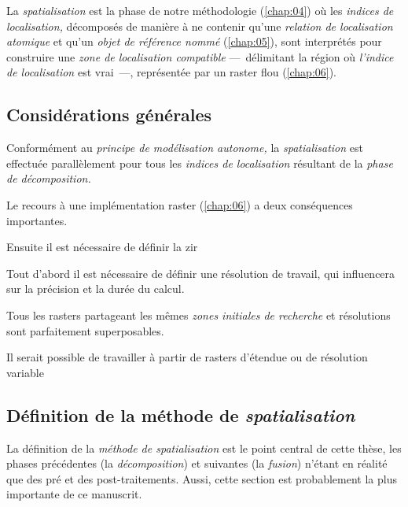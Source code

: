 La \emph{spatialisation} est la phase de notre méthodologie (\autoref{chap:04}) où les \emph{indices de localisation,} décomposés de manière à ne contenir qu'une \emph{relation de localisation atomique} et qu'un \emph{objet de référence nommé} (\autoref{chap:05}), sont interprétés pour construire une \emph{zone de localisation compatible} ---~délimitant la région où \emph{l'indice de localisation} est vrai~---, représentée par un raster flou (\autoref{chap:06}).

\subsection{Considérations générales}


Conformément au \emph{principe de modélisation autonome,} la \emph{spatialisation} est effectuée parallèlement pour tous les \emph{indices de localisation} résultant de la \emph{phase de décomposition.} 

Le recours à une implémentation raster (\autoref{chap:06}) a deux conséquences importantes. 

Ensuite il est nécessaire de définir la \ac{zir}

Tout d'abord il est nécessaire de définir une résolution de travail, qui influencera sur la précision et la durée du calcul.

Tous les rasters partageant les mêmes \emph{zones initiales de recherche} et résolutions sont parfaitement superposables.

%
Il serait possible de travailler à partir de rasters d'étendue ou de résolution variable




\subsection{Définition de la méthode de \emph{spatialisation}}


La définition de la \emph{méthode de spatialisation} est le point central de cette thèse, les phases précédentes (\ie la \emph{décomposition}) et suivantes (\ie la \emph{fusion}) n'étant en réalité que des pré et des post-traitements. Aussi, cette section est probablement la plus importante de ce manuscrit.

